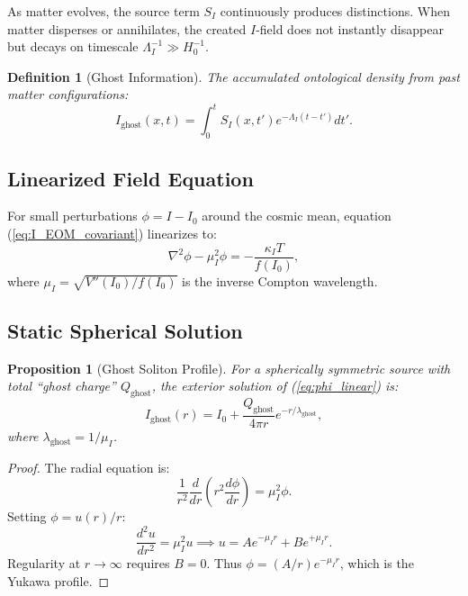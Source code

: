 \documentclass[12pt, a4paper]{article}
\newtheorem{definition}{Definition}
\newtheorem{proposition}{Proposition}
\begin{document}
As matter evolves, the source term $S_I$ continuously produces distinctions. When matter disperses or annihilates, the created $I$-field does not instantly disappear but decays on timescale $\Lambda_I^{-1} \gg H_0^{-1}$.

\begin{definition}[Ghost Information]
The accumulated ontological density from past matter configurations:
\begin{equation}
    I_{\text{ghost}}(x, t) = \int_0^t S_I(x, t') e^{-\Lambda_I(t-t')} dt'.
    \label{eq:I_ghost_def}
\end{equation}
\end{definition}

\subsection{Linearized Field Equation}

For small perturbations $\phi = I - I_0$ around the cosmic mean, equation (\ref{eq:I_EOM_covariant}) linearizes to:
\begin{equation}
    \nabla^2 \phi - \mu_I^2 \phi = -\frac{\kappa_I T}{f(I_0)},
    \label{eq:phi_linear}
\end{equation}
where $\mu_I = \sqrt{V''(I_0)/f(I_0)}$ is the inverse Compton wavelength.

\subsection{Static Spherical Solution}

\begin{proposition}[Ghost Soliton Profile]
For a spherically symmetric source with total ``ghost charge'' $Q_{\text{ghost}}$, the exterior solution of (\ref{eq:phi_linear}) is:
\begin{equation}
    I_{\text{ghost}}(r) = I_0 + \frac{Q_{\text{ghost}}}{4\pi r} e^{-r/\lambda_{\text{ghost}}},
    \label{eq:I_ghost_exterior}
\end{equation}
where $\lambda_{\text{ghost}} = 1/\mu_I$.
\end{proposition}

\begin{proof}
The radial equation is:
\[
    \frac{1}{r^2}\frac{d}{dr}\left(r^2 \frac{d\phi}{dr}\right) = \mu_I^2 \phi.
\]
Setting $\phi = u(r)/r$:
\[
    \frac{d^2 u}{dr^2} = \mu_I^2 u \implies u = A e^{-\mu_I r} + B e^{+\mu_I r}.
\]
Regularity at $r \to \infty$ requires $B = 0$. Thus $\phi = (A/r) e^{-\mu_I r}$, which is the Yukawa profile.
\end{proof}
\end{document}
